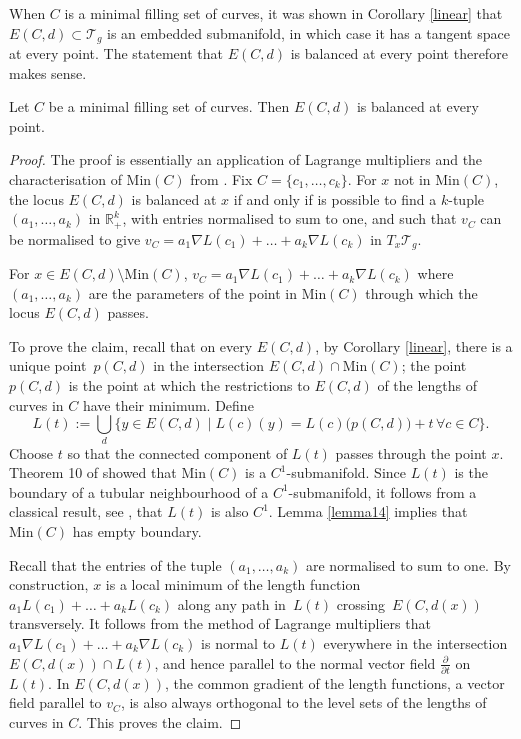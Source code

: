 \begin{Remark}
When $C$ is a minimal filling set of curves, it was shown in Corollary \ref{linear} that~${E(C,d)\subset \mathcal{T}_{g}}$ is an embedded submanifold, in which case it has a tangent space at every point. The statement that $E(C,d)$ is balanced at every point therefore makes sense.
\end{Remark}
\begin{Proposition}
\label{balancedlem}
Let $C$ be a minimal filling set of curves. Then $E(C,d)$ is balanced at every point.
\end{Proposition}
\begin{proof}
The proof is essentially an application of Lagrange multipliers and the characterisation of $\mathrm{Min}(C)$ from \cite{SchmutzMorse}. Fix $C=\{c_{1}, \dots, c_{k}\}$. For $x$ not in $\mathrm{Min}(C)$, the locus $E(C,d)$ is balanced at $x$ if and only if is possible to find a $k$-tuple $(a_{1}, \dots, a_{k})$ in $\mathbb{R}_{+}^{k}$, with entries normalised to sum to one, and such that $v_{C}$ can be normalised to give $v_{C}=a_{1}\nabla L(c_{1})+\dots+a_{k}\nabla L(c_{k})$ in $T_{x}\mathcal{T}_{g}$.

\begin{Claim} For $x\in E(C,d)\setminus \mathrm{Min}(C)$, $v_{C}=a_{1}\nabla L(c_{1})+\dots+a_{k}\nabla L(c_{k})$ where $(a_{1}, \dots, a_{k})$ are the parameters of the point in $\mathrm{Min}(C)$ through which the locus $E(C,d)$ passes.
\end{Claim}

To prove the claim, recall that on every $E(C, d)$, by Corollary \ref{linear}, there is a unique point~$p(C,d)$ in the intersection $E(C,d)\cap\mathrm{Min}(C)$; the point $p(C,d)$ is the point at which the restrictions to $E(C,d)$ of the lengths of curves in $C$ have their minimum. Define
\begin{equation*}
 L(t):=\bigcup_{d}\{y\in E(C,d) \mid L(c)(y)=L(c)\bigl(p(C,d)\bigr)+t \, \forall c\in C\}.
\end{equation*}
Choose $t$ so that the connected component of $L(t)$ passes through the point $x$. Theorem 10 of \cite{SchmutzMorse} showed that $\mathrm{Min}(C)$ is a $C^{1}$-submanifold. Since $L(t)$ is the boundary of a tubular neighbourhood of a $C^{1}$-submanifold, it follows from a classical result, see \cite{Foote}, that $L(t)$ is also $C^{1}$. Lemma \ref{lemma14} implies that $\mathrm{Min}(C)$ has empty boundary.

Recall that the entries of the tuple $(a_{1}, \dots, a_{k})$ are normalised to sum to one. By construction, $x$ is a local minimum of the length function $a_{1}L(c_{1})+\dots+a_{k}L(c_{k})$ along any path in~$L(t)$ crossing~$E(C,d(x))$ transversely. It follows from the method of Lagrange multipliers that~${a_{1}\nabla L(c_{1})+\dots+a_{k}\nabla L(c_{k})}$ is normal to $L(t)$ everywhere in the intersection $E(C,d(x))\cap L(t)$, and hence parallel to the normal vector field $\frac{\partial}{\partial t}$ on $L(t)$. In $E(C,d(x))$, the common gradient of the length functions, a vector field parallel to $v_{C}$, is also always orthogonal to the level sets of the lengths of curves in $C$. This proves the claim.


\end{proof}
